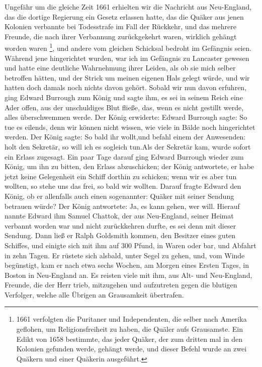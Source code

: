 Ungefähr um die gleiche Zeit 1661 erhielten wir die Nachricht 
aus Neu-England, das die dortige Regierung ein Gesetz
erlassen hatte, das die Quäker aus jenen Kolonien verbannte bei
Todesstrafe im Fall der Rückkehr, und das mehrere Freunde, die
nach ihrer Verbannung zurückgekehrt waren, wirklich gehängt
worden waren \footnote{1661 verfolgten die Puritaner und 
Independenten, die selber nach Amerika geflohen, um 
Religionsfreiheit zu haben, die Quäler aufs Grausamste.
Ein Edikt von 1658 bestimmte, das jeder Quäker, der zum dritten 
mal in den Kolonien gefunden werde, gehängt werde, und 
dieser Befehl wurde an zwei Quäkern und einer Quäkerin 
ausgeführt.}, und andere vom gleichen Schicksal bedroht im
Gefängnis seien. Während jene hingerichtet wurden, war ich im
Gefängnis zu Lancaster gewesen und hatte eine deutliche Wahrnehmung 
ihrer Leiden, als ob sie mich selber betroffen hätten,
und der Strick um meinen eigenen Hals gelegt würde, und wir
hatten doch damals noch nichts davon gehört. Sobald wir nun
davon erfuhren, ging Edward Burrough zum König und sagte
ihm, es sei in seinem Reich eine Ader offen, aus der unschuldiges
Blut fließe, das, wenn es nicht gestillt werde, alles überschwemmen
werde. Der König erwiderte: 
Edward Burrough sagte: \glqq So tue es eilends, denn wir können nicht
wissen, wie viele in Bälde noch hingerichtet werden.\grqq{} Der König
sagte: \glqq So bald ihr wollt,\glqq und befahl einem der Anwesenden:
\grqq{} holt den Sekretär, so will ich es sogleich tun.\glqq Als der Sekretär
kam, wurde sofort ein Erlass zugesagt. Ein paar Tage darauf
ging Edward Burrough wieder zum König, um ihn zu bitten,
den Erlass abzuschicken; der König antwortete, er habe jetzt keine
Gelegenheit ein Schiff dorthin zu schicken; wenn wir es aber tun
wollten, so stehe uns das frei, so bald wir wollten. Darauf fragte
Edward den König, ob er allenfalls auch einen sogenannter:
\grqq{} Quäker\grqq{} mit seiner Sendung betrauen würde? Der König 
antwortete: \glqq Ja, es kann gehen, wer will.\grqq{} Hierauf nannte 
Edward ihm Samuel Chattok, der aus Neu-England, seiner Heimat
verbannt worden war und nicht zurückkehren durfte, es sei denn
mit dieser Sendung. Dann ließ er Ralph Goldsmith kommen,
den Besitzer eines guten Schiffes, und einigte sich mit ihm auf
300 Pfund, in Waren oder bar, und Abfahrt in zehn Tagen. Er
rüstete sich alsbald, unter Segel zu gehen, und, vom Winde 
begünstigt, kam er nach etwa sechs Wochen, am Morgen eines
Ersten Tages, in Boston in Neu-England an. Es reisten viele
mit ihm, aus Alt- und Neu-England, Freunde, die der Herr
trieb, mitzugehen und aufzutreten gegen die blutigen Verfolger,
welche alle Übrigen an Grausamkeit übertrafen.


